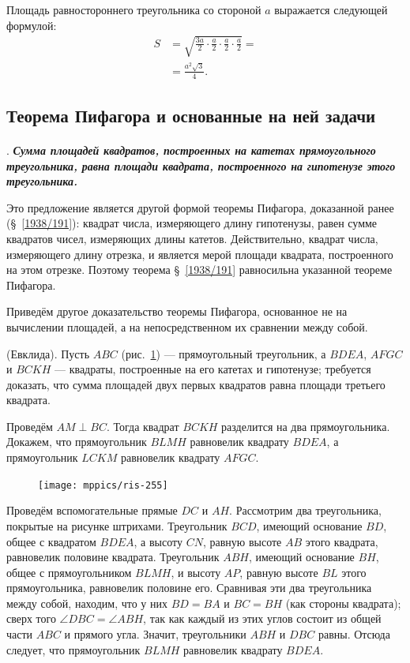 \documentclass[twoside]{book}
\begin{document}
\smallskip
{}
Площадь равностороннего треугольника со стороной $a$ выражается следующей формулой:
\begin{align*}S&=\sqrt{\frac{3a}2\cdot \frac a2\cdot \frac a2\cdot \frac a2}=
 \\
 &=\frac{a^2\sqrt{3}}{4}.
\end{align*}


\subsection*{Теорема Пифагора и основанные на ней задачи}

\paragraph{}\label{1938/257}
.
\textbf{\emph{Сумма площадей квадратов, построенных на катетах прямоугольного треугольника, равна площади квадрата, построенного на гипотенузе этого треугольника.}}

Это предложение является другой формой теоремы Пифагора, доказанной ранее (§~\ref{1938/191}):
квадрат числа, измеряющего длину гипотенузы, равен сумме квадратов чисел, измеряющих длины катетов.
Действительно, квадрат числа, измеряющего длину отрезка, и является мерой площади квадрата, построенного на этом отрезке.
Поэтому теорема §~\ref{1938/191} равносильна указанной теореме Пифагора.

Приведём другое доказательство теоремы Пифагора, основанное не на вычислении площадей, а на непосредственном их сравнении между собой.

\smallskip
\mbox{} (Евклида).
Пусть $ABC$ (рис.~\ref{1938/ris-255}) — прямоугольный треугольник, а $BDEA$, $AFGC$ и $BCKH$ — квадраты, построенные на его катетах и гипотенузе;
требуется доказать, что сумма площадей двух первых квадратов равна площади третьего квадрата.

Проведём $AM\perp BC$.
Тогда квадрат $BCKH$ разделится на два прямоугольника.
Докажем, что прямоугольник $BLMH$ равновелик квадрату $BDEA$, а прямоугольник $LCKM$ равновелик квадрату $AFGC$.

\begin{figure}
\centering
\texttt{[image: mppics/ris-255]}
\caption{}\label{1938/ris-255}
\end{figure}

Проведём вспомогательные прямые $DC$ и $AH$.
Рассмотрим два треугольника, покрытые на рисунке штрихами.
Треугольник $BCD$, имеющий основание $BD$, общее с квадратом $BDEA$, а высоту $CN$, 
равную высоте $AB$ этого квадрата, равновелик половине квадрата.
Треугольник $ABH$, имеющий основание $BH$, общее с прямоугольником $BLMH$, и высоту $AP$, 
равную высоте $BL$ этого прямоугольника, равновелик половине его.
Сравнивая эти два треугольника между собой, находим, что у них $BD = BA$ и $BC=BH$ (как стороны квадрата);
сверх того $\angle DBC=\angle ABH$, так как каждый из этих углов состоит из общей части $ABC$ и прямого угла.
Значит, треугольники $ABH$ и $DBC$ равны.
Отсюда следует, что прямоугольник $BLMH$ равновелик квадрату $BDEA$.
\end{document}
